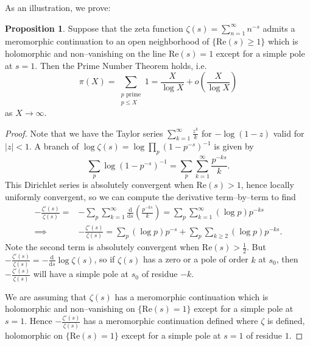 \documentclass{article}
\theoremstyle{definition}
\newtheorem{prop}[theorem]{Proposition}
\begin{document}
As an illustration, we prove:
\begin{prop}
    Suppose that the zeta function $\zeta(s) = \sum_{n=1}^{\infty} n^{-s}$ admits a meromorphic continuation to an open neighborhood of $\{\text{Re}(s)\ge 1\}$ which is holomorphic and non--vanishing on the line $\text{Re}(s)=1$ except for a simple pole at $s = 1$. Then the Prime Number Theorem holds, i.e. \[
    \pi(X) = \sum_{\substack{p \text{ prime}\\p\le X}}^{} 1 = \frac{X}{\log X}+ o \left(\frac{X}{\log X}\right)
    \]
    as $X \to \infty.$
\end{prop}
\begin{proof}
    Note that we have the Taylor series $\sum_{k=1}^{\infty} \frac{z^k}{k}$ for $-\log(1-z)$ valid for $|z|<1$. A branch of $\log \zeta(s) = \log \prod_{p}^{} (1-p^{-s})^{-1}$ is given by $$\sum_{p}^{} \log(1-p^{-s})^{-1} = \sum_{p}^{} \sum_{k = 1}^{\infty} \frac{p^{-ks}}{k}.$$
    This Dirichlet series is absolutely convergent when $\text{Re}(s)>1$, hence locally uniformly convergent, so we can compute the derivative term--by--term to find
    \begin{align*}
        -\frac{\zeta'(s)}{\zeta(s)} =& - \sum_{p}^{} \sum_{k= 1}^{\infty} \frac{\mathrm{d}}{\mathrm{d}s} \left(\frac{p^{-ks}}{k}\right) = \sum_{p}^{} \sum_{k=1}^{\infty} (\log p)p^{-ks} \\
        \implies& -\frac{\zeta'(s)}{\zeta(s)} = \sum_{p}^{} (\log p)p^{-s} + \sum_{p}^{} \sum_{k\ge 2}^{} (\log p)p^{-ks}.
    \end{align*}
    Note the second term is absolutely convergent when $\text{Re}(s)>\frac{1}{2}$. But $-\frac{\zeta'(s)}{\zeta(s)} = - \frac{\mathrm{d}}{\mathrm{d}s} \log \zeta(s)$, so if $\zeta(s)$ has a zero or a pole of order $k$ at $s_0$, then $-\frac{\zeta'(s)}{\zeta(s)}$ will have a simple pole at $s_0$ of residue $-k$. 
    \vspace{1mm}
     
    We are assuming that $\zeta(s)$ has a meromorphic continuation which is holomorphic and non--vanishing on $\{\text{Re}(s)=1\}$ except for a simple pole at $s=1$. Hence $-\frac{\zeta'(s)}{\zeta(s)}$ has a meromorphic continuation defined where $\zeta$ is defined, holomorphic on $\{\text{Re}(s)=1\}$ except for a simple pole at $s=1$ of residue $1$.
    \vspace{1mm}


\end{proof}
\end{document}
